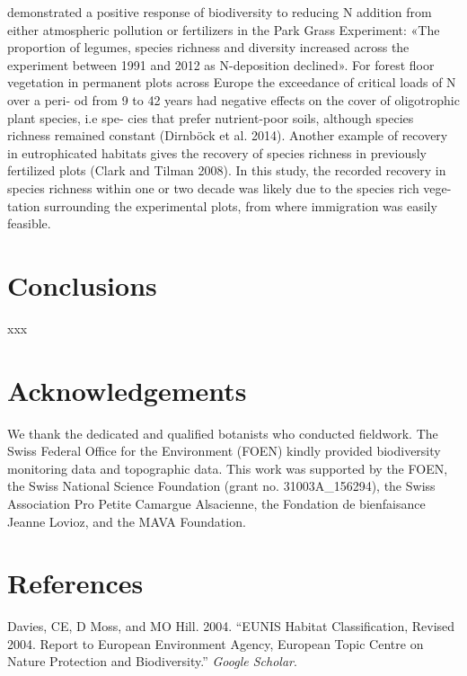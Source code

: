 \documentclass[fleqn,10pt,lineno]{wlpeerj} %
\theoremstyle{definition}
\theoremstyle{definition}
\theoremstyle{definition}
\theoremstyle{remark}
\begin{document}
\begin{itemize}
  demonstrated a positive response of biodiversity to reducing N
  addition from either atmospheric pollution or fertilizers in the Park
  Grass Experiment: «The proportion of legumes, species richness and
  diversity increased across the experiment between 1991 and 2012 as
  N-deposition declined». For forest floor vegetation in permanent plots
  across Europe the exceedance of critical loads of N over a peri- od
  from 9 to 42 years had negative effects on the cover of oligotrophic
  plant species, i.e spe- cies that prefer nutrient-poor soils, although
  species richness remained constant (Dirnböck et al. 2014). Another
  example of recovery in eutrophicated habitats gives the recovery of
  species richness in previously fertilized plots (Clark and Tilman
  2008). In this study, the recorded recovery in species richness within
  one or two decade was likely due to the species rich vege- tation
  surrounding the experimental plots, from where immigration was easily
  feasible.
\end{itemize}

\section*{Conclusions}\label{conclusions}

xxx

\section*{Acknowledgements}\label{acknowledgements}

We thank the dedicated and qualified botanists who conducted fieldwork.
The Swiss Federal Office for the Environment (FOEN) kindly provided
biodiversity monitoring data and topographic data. This work was
supported by the FOEN, the Swiss National Science Foundation (grant no.
31003A\_156294), the Swiss Association Pro Petite Camargue Alsacienne,
the Fondation de bienfaisance Jeanne Lovioz, and the MAVA Foundation.

\section*{References}\label{references}

\hypertarget{refs}{}
\hypertarget{ref-Davies2004}{}
Davies, CE, D Moss, and MO Hill. 2004. ``EUNIS Habitat Classification,
Revised 2004. Report to European Environment Agency, European Topic
Centre on Nature Protection and Biodiversity.'' \emph{Google Scholar}.
\end{document}
